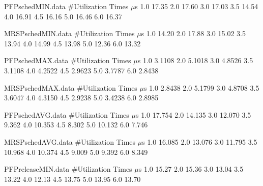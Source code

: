 \begin{filecontents}{PFPschedMIN.data}
#Utilization   Times $\mu$s
1.0  17.35
2.0  17.60
3.0  17.03
3.5  14.54
4.0  16.91
4.5  16.16
5.0  16.46
6.0  16.37
\end{filecontents}

\begin{filecontents}{MRSPschedMIN.data}
#Utilization   Times $\mu$s
1.0  14.20
2.0  17.88
3.0  15.02
3.5  13.94
4.0  14.99
4.5  13.98
5.0  12.36
6.0  13.32
\end{filecontents}

\begin{filecontents}{PFPschedMAX.data}
#Utilization   Times $\mu$s
1.0  3.1108
2.0  5.1018
3.0  4.8526
3.5  3.1108
4.0  4.2522
4.5  2.9623
5.0  3.7787
6.0  2.8438
\end{filecontents}

\begin{filecontents}{MRSPschedMAX.data}
#Utilization   Times $\mu$s
1.0  2.8438
2.0  5.1799
3.0  4.8708
3.5  3.6047
4.0  4.3150
4.5  2.9238
5.0  3.4238
6.0  2.8985
\end{filecontents}

\begin{filecontents}{PFPschedAVG.data}
#Utilization   Times $\mu$s
1.0  17.754
2.0  14.135
3.0  12.070
3.5  9.362
4.0  10.353
4.5  8.302
5.0  10.132
6.0  7.746
\end{filecontents}

\begin{filecontents}{MRSPschedAVG.data}
#Utilization   Times $\mu$s
1.0  16.085
2.0  13.076
3.0  11.795
3.5  10.968
4.0  10.374
4.5  9.009
5.0  9.392
6.0  8.349
\end{filecontents}


\begin{filecontents}{PFPreleaseMIN.data}
#Utilization   Times $\mu$s
1.0  15.27
2.0  15.36
3.0  13.04
3.5  13.22
4.0  12.13
4.5  13.75
5.0  13.95
6.0  13.70
\end{filecontents}

